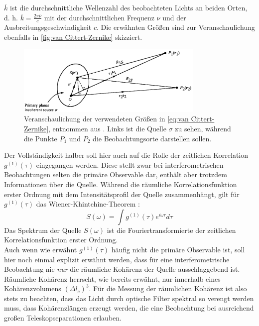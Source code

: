 $\overline{k}$ ist die durchschnittliche Wellenzahl des beobachteten Lichts an beiden Orten, d. h. $\overline{k} = \frac{2\pi\overline{\nu}}{c}$ mit der durchschnittlichen Frequenz $\nu$ und der Ausbreitungsgeschwindigkeit $c$. 
Die erwähnten Größen sind zur Veranschaulichung ebenfalls in \autoref{fig:van Cittert-Zernike} skizziert. 
\begin{figure}[h]
    \centering
    \includegraphics[width=0.8\textwidth]{images/Theorie/Mandel_4.12.png}
    \caption{Veranschaulichung der verwendeten Größen in \autoref{eq:van Cittert-Zernike}, entnommen aus \cite[Abb. 4.12]{mandelOpticalCoherenceQuantum1995}. Links ist die Quelle $\sigma$ zu sehen, während die Punkte $P_1$ und $P_2$ die Beobachtungsorte darstellen sollen. }
    \label{fig:van Cittert-Zernike}
\end{figure}

Der Vollständigkeit halber soll hier auch auf die Rolle der zeitlichen Korrelation $g^{(1)}(\tau)$ eingegangen werden. 
Diese stellt zwar bei interferometrischen Beobachtungen selten die primäre Observable dar, enthält aber trotzdem Informationen über die Quelle. 
Während die räumliche Korrelationsfunktion erster Ordnung mit dem Intensitätsprofil der Quelle zusammenhängt, gilt für $g^{(1)}(\tau)$ das Wiener-Khintchine-Theorem \cite{lasseguesFieldIntensityCorrelations2022}:
\begin{equation}
    S(\omega) =  \int g^{(1)}(\tau) e^{i\omega\tau} d\tau
\end{equation}
Das Spektrum der Quelle $S(\omega)$ ist die Fouriertransformierte der zeitlichen Korrelationsfunktion erster Ordnung. \\
Auch wenn wie erwähnt $g^{(1)}(\tau)$ häufig nicht die primäre Observable ist, soll hier noch einmal explizit erwähnt werden, dass für eine interferometrische Beobachtung nie \emph{nur} die räumliche Kohärenz der Quelle ausschlaggebend ist. 
Räumliche Kohärenz herrscht, wie bereits erwähnt, nur innerhalb eines Kohärenzvolumens $(\Delta l_c) ^3$. 
Für die Messung der räumlichen Kohärenz ist also stets zu beachten, dass das Licht durch optische Filter spektral so verengt werden muss, dass Kohärenzlängen erzeugt werden, die eine Beobachtung bei ausreichend großen Teleskopseparationen erlauben. \\

